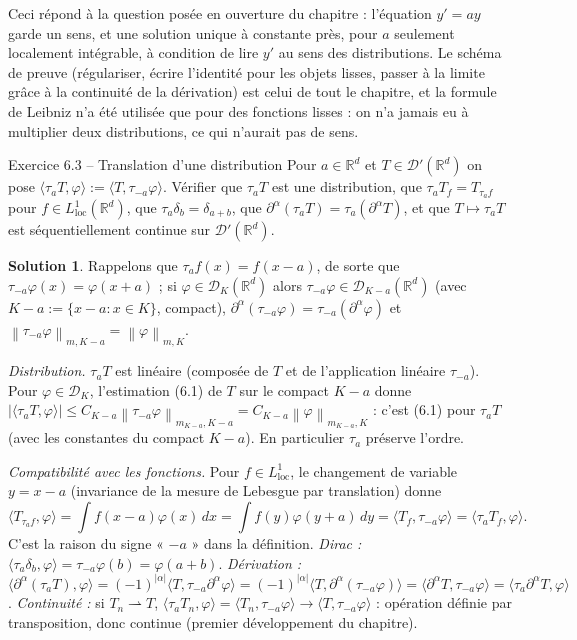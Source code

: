 \documentclass[11pt,a4paper]{article}
\newcommand{\R}{\mathbb{R}}
\newcommand{\norm}[1]{\left\|#1\right\|}
\newcommand{\D}{\mathcal{D}}
\theoremstyle{definition}
\newtheorem*{solution}{Solution}
\begin{document}
\begin{commentaire}
Ceci répond à la question posée en ouverture du chapitre : l'équation $y'=ay$ garde un sens, et une solution unique à constante près, pour $a$ seulement localement intégrable, à condition de lire $y'$ au sens des distributions. Le schéma de preuve (régulariser, écrire l'identité pour les objets lisses, passer à la limite grâce à la continuité de la dérivation) est celui de tout le chapitre, et la formule de Leibniz n'a été utilisée que pour des fonctions lisses : on n'a jamais eu à multiplier deux distributions, ce qui n'aurait pas de sens.
\end{commentaire}

\begin{exo}{Exercice 6.3 -- Translation d'une distribution}
Pour $a\in\R^d$ et $T\in\D'(\R^d)$ on pose $\langle\tau_aT,\varphi\rangle:=\langle T,\tau_{-a}\varphi\rangle$. Vérifier que $\tau_aT$ est une distribution, que $\tau_aT_f=T_{\tau_af}$ pour $f\in L^1_{\mathrm{loc}}(\R^d)$, que $\tau_a\delta_b=\delta_{a+b}$, que $\partial^\alpha(\tau_aT)=\tau_a(\partial^\alpha T)$, et que $T\mapsto\tau_aT$ est séquentiellement continue sur $\D'(\R^d)$.
\end{exo}

\begin{solution}
Rappelons que $\tau_af(x)=f(x-a)$, de sorte que $\tau_{-a}\varphi(x)=\varphi(x+a)$ ; si $\varphi\in\D_K(\R^d)$ alors $\tau_{-a}\varphi\in\D_{K-a}(\R^d)$ (avec $K-a:=\{x-a:x\in K\}$, compact), $\partial^\alpha(\tau_{-a}\varphi)=\tau_{-a}(\partial^\alpha\varphi)$ et $\norm{\tau_{-a}\varphi}_{m,K-a}=\norm\varphi_{m,K}$.

\emph{Distribution.} $\tau_aT$ est linéaire (composée de $T$ et de l'application linéaire $\tau_{-a}$). Pour $\varphi\in\D_K$, l'estimation (6.1) de $T$ sur le compact $K-a$ donne $|\langle\tau_aT,\varphi\rangle|\le C_{K-a}\norm{\tau_{-a}\varphi}_{m_{K-a},K-a}=C_{K-a}\norm\varphi_{m_{K-a},K}$ : c'est (6.1) pour $\tau_aT$ (avec les constantes du compact $K-a$). En particulier $\tau_a$ préserve l'ordre.

\emph{Compatibilité avec les fonctions.} Pour $f\in L^1_{\mathrm{loc}}$, le changement de variable $y=x-a$ (invariance de la mesure de Lebesgue par translation) donne
\[
\langle T_{\tau_af},\varphi\rangle=\int f(x-a)\varphi(x)\,dx=\int f(y)\varphi(y+a)\,dy=\langle T_f,\tau_{-a}\varphi\rangle=\langle\tau_aT_f,\varphi\rangle .
\]
C'est la raison du signe « $-a$ » dans la définition. \emph{Dirac :} $\langle\tau_a\delta_b,\varphi\rangle=\tau_{-a}\varphi(b)=\varphi(a+b)$. \emph{Dérivation :} $\langle\partial^\alpha(\tau_aT),\varphi\rangle=(-1)^{|\alpha|}\langle T,\tau_{-a}\partial^\alpha\varphi\rangle=(-1)^{|\alpha|}\langle T,\partial^\alpha(\tau_{-a}\varphi)\rangle=\langle\partial^\alpha T,\tau_{-a}\varphi\rangle=\langle\tau_a\partial^\alpha T,\varphi\rangle$. \emph{Continuité :} si $T_n\rightharpoonup T$, $\langle\tau_aT_n,\varphi\rangle=\langle T_n,\tau_{-a}\varphi\rangle\to\langle T,\tau_{-a}\varphi\rangle$ : opération définie par transposition, donc continue (premier développement du chapitre).
\end{solution}
\end{document}
